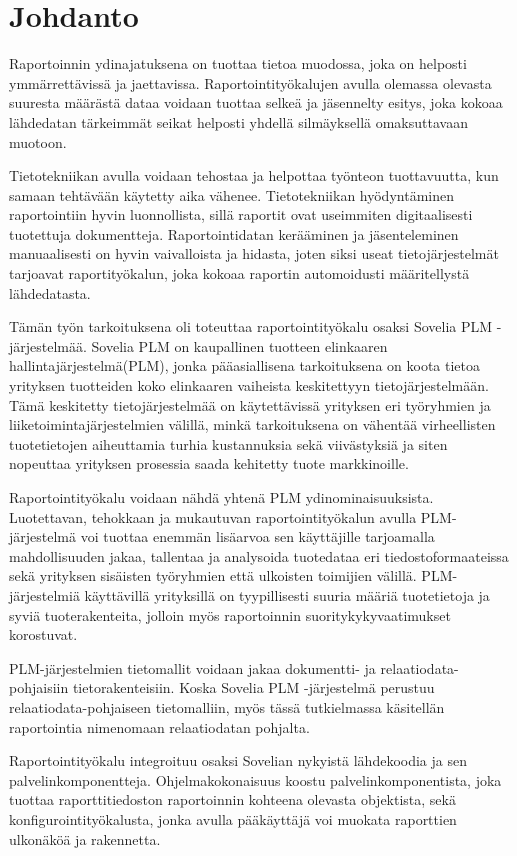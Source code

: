 \chapter{Johdanto} \label{Johdanto}

Raportoinnin ydinajatuksena on tuottaa tietoa muodossa, joka on helposti ymmärrettävissä ja jaettavissa. Raportointityökalujen avulla olemassa olevasta suuresta määrästä dataa voidaan tuottaa selkeä ja jäsennelty esitys, joka kokoaa lähdedatan tärkeimmät seikat helposti yhdellä silmäyksellä omaksuttavaan muotoon.

Tietotekniikan avulla voidaan tehostaa ja helpottaa työnteon tuottavuutta, kun samaan tehtävään käytetty aika vähenee. Tietotekniikan hyödyntäminen raportointiin hyvin luonnollista, sillä raportit ovat useimmiten digitaalisesti tuotettuja dokumentteja. Raportointidatan kerääminen ja jäsenteleminen manuaalisesti on hyvin vaivalloista ja hidasta, joten siksi useat tietojärjestelmät tarjoavat raportityökalun, joka kokoaa raportin automoidusti määritellystä lähdedatasta.

Tämän työn tarkoituksena oli toteuttaa raportointityökalu osaksi Sovelia PLM -järjestelmää. Sovelia PLM on kaupallinen tuotteen elinkaaren hallintajärjestelmä(PLM), jonka pääasiallisena tarkoituksena on koota tietoa yrityksen tuotteiden koko elinkaaren vaiheista keskitettyyn tietojärjestelmään. Tämä keskitetty tietojärjestelmää on käytettävissä yrityksen eri työryhmien ja liiketoimintajärjestelmien välillä, minkä tarkoituksena on vähentää virheellisten tuotetietojen aiheuttamia turhia kustannuksia sekä viivästyksiä ja siten nopeuttaa yrityksen prosessia saada kehitetty tuote markkinoille.

Raportointityökalu voidaan nähdä yhtenä PLM ydinominaisuuksista. Luotettavan, tehokkaan ja mukautuvan raportointityökalun avulla PLM-järjestelmä voi tuottaa enemmän lisäarvoa sen käyttäjille tarjoamalla mahdollisuuden jakaa, tallentaa ja analysoida tuotedataa eri tiedostoformaateissa sekä yrityksen sisäisten työryhmien että ulkoisten toimijien välillä. PLM-järjestelmiä käyttävillä yrityksillä on tyypillisesti suuria määriä tuotetietoja ja syviä tuoterakenteita, jolloin myös raportoinnin suoritykykyvaatimukset korostuvat.

PLM-järjestelmien tietomallit voidaan jakaa dokumentti- ja relaatiodata-pohjaisiin tietorakenteisiin. \cite{david_what_2016} Koska Sovelia PLM -järjestelmä perustuu relaatiodata-pohjaiseen tietomalliin, myös tässä tutkielmassa käsitellän raportointia nimenomaan relaatiodatan pohjalta.

Raportointityökalu integroituu osaksi Sovelian nykyistä lähdekoodia ja sen palvelinkomponentteja. Ohjelmakokonaisuus koostu palvelinkomponentista, joka tuottaa raporttitiedoston raportoinnin kohteena olevasta objektista, sekä konfigurointityökalusta, jonka avulla pääkäyttäjä voi muokata raporttien ulkonäköä ja rakennetta.
